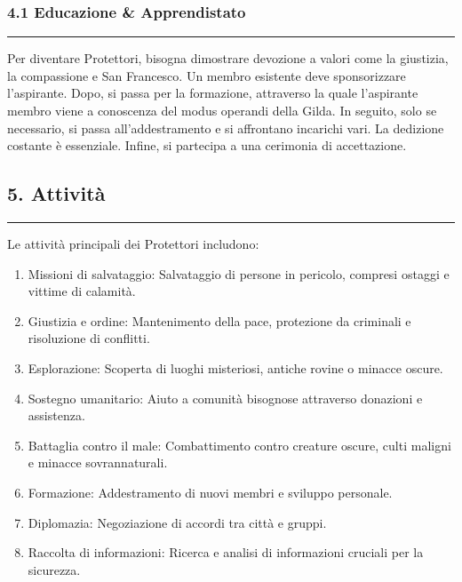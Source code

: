 \subsubsection{4.1 Educazione \&
Apprendistato}\label{educazione-apprendistato}

\begin{center}\rule{0.5\linewidth}{0.5pt}\end{center}

Per diventare Protettori, bisogna dimostrare devozione a valori come la
giustizia, la compassione e San Francesco. Un membro esistente deve
sponsorizzare l'aspirante. Dopo, si passa per la formazione, attraverso
la quale l'aspirante membro viene a conoscenza del modus operandi della
Gilda. In seguito, solo se necessario, si passa all'addestramento e si
affrontano incarichi vari. La dedizione costante è essenziale. Infine,
si partecipa a una cerimonia di accettazione.

\subsection{5. Attività}\label{attivituxe0}

\begin{center}\rule{0.5\linewidth}{0.5pt}\end{center}

Le attività principali dei Protettori includono:

\begin{enumerate}
\def\labelenumi{\arabic{enumi}.}
\tightlist
\item
  Missioni di salvataggio: Salvataggio di persone in pericolo, compresi
  ostaggi e vittime di calamità.
\item
  Giustizia e ordine: Mantenimento della pace, protezione da criminali e
  risoluzione di conflitti.
\item
  Esplorazione: Scoperta di luoghi misteriosi, antiche rovine o minacce
  oscure.
\item
  Sostegno umanitario: Aiuto a comunità bisognose attraverso donazioni e
  assistenza.
\item
  Battaglia contro il male: Combattimento contro creature oscure, culti
  maligni e minacce sovrannaturali.
\item
  Formazione: Addestramento di nuovi membri e sviluppo personale.
\item
  Diplomazia: Negoziazione di accordi tra città e gruppi.
\item
  Raccolta di informazioni: Ricerca e analisi di informazioni cruciali
  per la sicurezza.
\end{enumerate}

